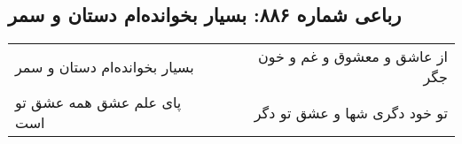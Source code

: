 \begin{center}
\section*{رباعی شماره ۸۸۶: بسیار بخوانده‌ام دستان و سمر}
\label{sec:0886}
\begin{longtable}{l p{0.5cm} r}
بسیار بخوانده‌ام دستان و سمر
&&
از عاشق و معشوق و غم و خون جگر
\\
پای علم عشق همه عشق تو است
&&
تو خود دگری شها و عشق تو دگر
\\
\end{longtable}
\end{center}
